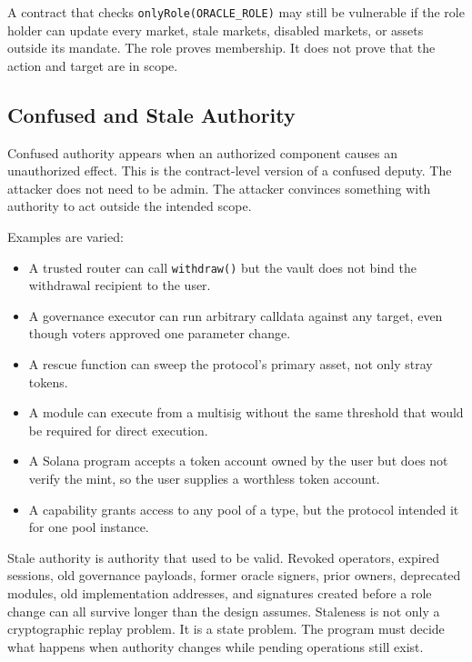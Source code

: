\begin{failuremodebox}
A contract that checks \texttt{onlyRole(ORACLE\_ROLE)} may still be vulnerable if the role holder can update every market, stale markets, disabled markets, or assets outside its mandate. The role proves membership. It does not prove that the action and target are in scope.
\end{failuremodebox}

\subsection{Confused and Stale Authority}

Confused authority appears when an authorized component causes an unauthorized effect. This is the contract-level version of a confused deputy. The attacker does not need to be admin. The attacker convinces something with authority to act outside the intended scope.

Examples are varied:

\begin{itemize}
\item A trusted router can call \texttt{withdraw()} but the vault does not bind the withdrawal recipient to the user.
\item A governance executor can run arbitrary calldata against any target, even though voters approved one parameter change.
\item A rescue function can sweep the protocol's primary asset, not only stray tokens.
\item A module can execute from a multisig without the same threshold that would be required for direct execution.
\item A Solana program accepts a token account owned by the user but does not verify the mint, so the user supplies a worthless token account.
\item A capability grants access to any pool of a type, but the protocol intended it for one pool instance.
\end{itemize}

Stale authority is authority that used to be valid. Revoked operators, expired sessions, old governance payloads, former oracle signers, prior owners, deprecated modules, old implementation addresses, and signatures created before a role change can all survive longer than the design assumes. Staleness is not only a cryptographic replay problem. It is a state problem. The program must decide what happens when authority changes while pending operations still exist.

